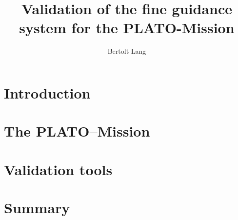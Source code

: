 \documentclass[11pt,a4paper]{report}
\author{Bertolt Lang}
\title{Validation of the fine guidance system for the PLATO-Mission}
\begin{document}
\maketitle
\begin{abstract}

\end{abstract}
\tableofcontents
\chapter{Introduction}

\chapter{The PLATO--Mission}

\chapter{Validation tools}

\chapter{Summary}

\end{document}

